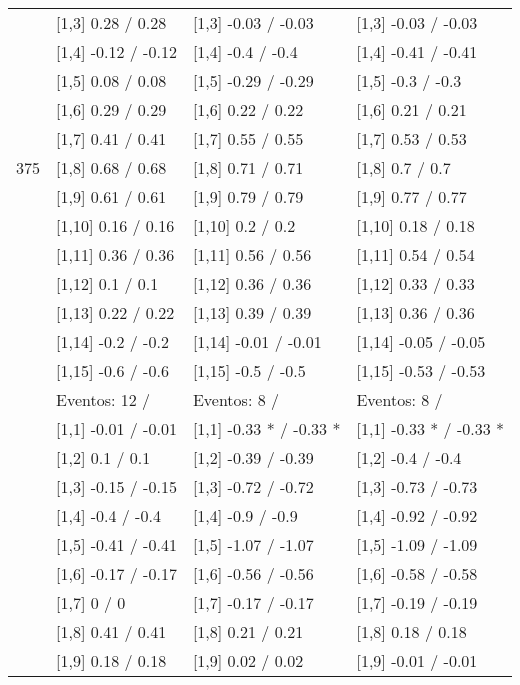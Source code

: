 \begin{table}
\begin{tabular}[t]{llll}
 & {}[1,3] 0.28  / 0.28 & {}[1,3] -0.03  / -0.03 & {}[1,3] -0.03  / -0.03\\
\addlinespace
 & {}[1,4] -0.12  / -0.12 & {}[1,4] -0.4  / -0.4 & {}[1,4] -0.41  / -0.41\\
 & {}[1,5] 0.08  / 0.08 & {}[1,5] -0.29  / -0.29 & {}[1,5] -0.3  / -0.3\\
 & {}[1,6] 0.29  / 0.29 & {}[1,6] 0.22  / 0.22 & {}[1,6] 0.21  / 0.21\\
 & {}[1,7] 0.41  / 0.41 & {}[1,7] 0.55  / 0.55 & {}[1,7] 0.53  / 0.53\\
375 & {}[1,8] 0.68  / 0.68 & {}[1,8] 0.71  / 0.71 & {}[1,8] 0.7  / 0.7\\
\addlinespace
 & {}[1,9] 0.61  / 0.61 & {}[1,9] 0.79  / 0.79 & {}[1,9] 0.77  / 0.77\\
 & {}[1,10] 0.16  / 0.16 & {}[1,10] 0.2  / 0.2 & {}[1,10] 0.18  / 0.18\\
 & {}[1,11] 0.36  / 0.36 & {}[1,11] 0.56  / 0.56 & {}[1,11] 0.54  / 0.54\\
 & {}[1,12] 0.1  / 0.1 & {}[1,12] 0.36  / 0.36 & {}[1,12] 0.33  / 0.33\\
 & {}[1,13] 0.22  / 0.22 & {}[1,13] 0.39  / 0.39 & {}[1,13] 0.36  / 0.36\\
\addlinespace
 & {}[1,14] -0.2  / -0.2 & {}[1,14] -0.01  / -0.01 & {}[1,14] -0.05  / -0.05\\
 & {}[1,15] -0.6  / -0.6 & {}[1,15] -0.5  / -0.5 & {}[1,15] -0.53  / -0.53\\
 & Eventos:  12 / & Eventos:  8 / & Eventos:  8 /\\
 & {}[1,1] -0.01  / -0.01 & {}[1,1] -0.33 * / -0.33 * & {}[1,1] -0.33 * / -0.33 *\\
 & {}[1,2] 0.1  / 0.1 & {}[1,2] -0.39  / -0.39 & {}[1,2] -0.4  / -0.4\\
\addlinespace
 & {}[1,3] -0.15  / -0.15 & {}[1,3] -0.72  / -0.72 & {}[1,3] -0.73  / -0.73\\
 & {}[1,4] -0.4  / -0.4 & {}[1,4] -0.9  / -0.9 & {}[1,4] -0.92  / -0.92\\
 & {}[1,5] -0.41  / -0.41 & {}[1,5] -1.07  / -1.07 & {}[1,5] -1.09  / -1.09\\
 & {}[1,6] -0.17  / -0.17 & {}[1,6] -0.56  / -0.56 & {}[1,6] -0.58  / -0.58\\
 & {}[1,7] 0  / 0 & {}[1,7] -0.17  / -0.17 & {}[1,7] -0.19  / -0.19\\
\addlinespace
500 & {}[1,8] 0.41  / 0.41 & {}[1,8] 0.21  / 0.21 & {}[1,8] 0.18  / 0.18\\
 & {}[1,9] 0.18  / 0.18 & {}[1,9] 0.02  / 0.02 & {}[1,9] -0.01  / -0.01\\

\end{tabular}
\end{table}
